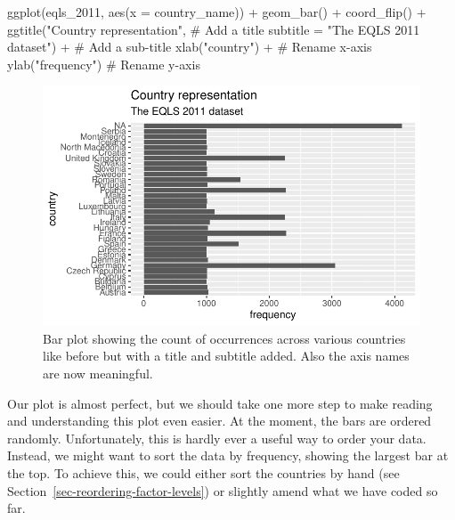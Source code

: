 \documentclass[
  letterpaper,
]{krantz}
\makeatletter
\newenvironment{Shaded}{\begin{snugshade}}{\end{snugshade}}
\newcommand{\AttributeTok}[1]{\textcolor[rgb]{0.40,0.45,0.13}{#1}}
\newcommand{\CommentTok}[1]{\textcolor[rgb]{0.37,0.37,0.37}{#1}}
\newcommand{\FunctionTok}[1]{\textcolor[rgb]{0.28,0.35,0.67}{#1}}
\newcommand{\NormalTok}[1]{\textcolor[rgb]{0.00,0.23,0.31}{#1}}
\newcommand{\SpecialCharTok}[1]{\textcolor[rgb]{0.37,0.37,0.37}{#1}}
\newcommand{\StringTok}[1]{\textcolor[rgb]{0.13,0.47,0.30}{#1}}
\newenvironment{kframe}{%
\medskip{}
\setlength{\fboxsep}{.8em}
 \def\at@end@of@kframe{}%
 \ifinner\ifhmode%
  \def\at@end@of@kframe{\end{minipage}}%
  \begin{minipage}{\columnwidth}%
 \fi\fi%
 \def\FrameCommand##1{\hskip\@totalleftmargin \hskip-\fboxsep
 \colorbox{shadecolor}{##1}\hskip-\fboxsep
     \hskip-\linewidth \hskip-\@totalleftmargin \hskip\columnwidth}%
 \MakeFramed {\advance\hsize-\width
   \@totalleftmargin\z@ \linewidth\hsize
   \@setminipage}}%
 {\par\unskip\endMakeFramed%
 \at@end@of@kframe}
\renewenvironment{Shaded}{\begin{kframe}}{\end{kframe}}
\makeatother
\begin{document}
\begin{Shaded}
\begin{Highlighting}[]
\FunctionTok{ggplot}\NormalTok{(eqls\_2011, }\FunctionTok{aes}\NormalTok{(}\AttributeTok{x =}\NormalTok{ country\_name)) }\SpecialCharTok{+}
  \FunctionTok{geom\_bar}\NormalTok{() }\SpecialCharTok{+}
  \FunctionTok{coord\_flip}\NormalTok{() }\SpecialCharTok{+}
  \FunctionTok{ggtitle}\NormalTok{(}\StringTok{"Country representation"}\NormalTok{,              }\CommentTok{\# Add a title}
          \AttributeTok{subtitle =} \StringTok{"The EQLS 2011 dataset"}\NormalTok{) }\SpecialCharTok{+}  \CommentTok{\# Add a sub{-}title}
  \FunctionTok{xlab}\NormalTok{(}\StringTok{"country"}\NormalTok{) }\SpecialCharTok{+}                              \CommentTok{\# Rename x{-}axis}
  \FunctionTok{ylab}\NormalTok{(}\StringTok{"frequency"}\NormalTok{)                              }\CommentTok{\# Rename y{-}axis}
\end{Highlighting}
\end{Shaded}

\begin{figure}[H]

{\centering \includegraphics{08_descriptive_statistics_files/figure-latex/country-barplot-extras-formatted-1.pdf}

}

\caption{Bar plot showing the count of occurrences across various
countries like before but with a title and subtitle added. Also the axis
names are now meaningful.}

\end{figure}%

Our plot is almost perfect, but we should take one more step to make
reading and understanding this plot even easier. At the moment, the bars
are ordered randomly. Unfortunately, this is hardly ever a useful way to
order your data. Instead, we might want to sort the data by frequency,
showing the largest bar at the top. To achieve this, we could either
sort the countries by hand (see
Section~\ref{sec-reordering-factor-levels}) or slightly amend what we
have coded so far.
\end{document}
